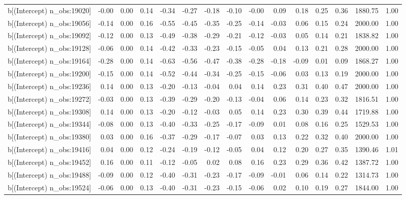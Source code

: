 \begin{table}[ht]
\begin{tabular}{rrrrrrrrrrrrrrr}
  b[(Intercept) n\_obs:19020] & -0.00 & 0.00 & 0.14 & -0.34 & -0.27 & -0.18 & -0.10 & -0.00 & 0.09 & 0.18 & 0.25 & 0.36 & 1880.75 & 1.00 \\ 
  b[(Intercept) n\_obs:19056] & -0.14 & 0.00 & 0.16 & -0.55 & -0.45 & -0.35 & -0.25 & -0.14 & -0.03 & 0.06 & 0.15 & 0.24 & 2000.00 & 1.00 \\ 
  b[(Intercept) n\_obs:19092] & -0.12 & 0.00 & 0.13 & -0.49 & -0.38 & -0.29 & -0.21 & -0.12 & -0.03 & 0.05 & 0.14 & 0.21 & 1838.82 & 1.00 \\ 
  b[(Intercept) n\_obs:19128] & -0.06 & 0.00 & 0.14 & -0.42 & -0.33 & -0.23 & -0.15 & -0.05 & 0.04 & 0.13 & 0.21 & 0.28 & 2000.00 & 1.00 \\ 
  b[(Intercept) n\_obs:19164] & -0.28 & 0.00 & 0.14 & -0.63 & -0.56 & -0.47 & -0.38 & -0.28 & -0.18 & -0.09 & 0.01 & 0.09 & 1868.27 & 1.00 \\ 
  b[(Intercept) n\_obs:19200] & -0.15 & 0.00 & 0.14 & -0.52 & -0.44 & -0.34 & -0.25 & -0.15 & -0.06 & 0.03 & 0.13 & 0.19 & 2000.00 & 1.00 \\ 
  b[(Intercept) n\_obs:19236] & 0.14 & 0.00 & 0.13 & -0.20 & -0.13 & -0.04 & 0.04 & 0.14 & 0.23 & 0.31 & 0.40 & 0.47 & 2000.00 & 1.00 \\ 
  b[(Intercept) n\_obs:19272] & -0.03 & 0.00 & 0.13 & -0.39 & -0.29 & -0.20 & -0.13 & -0.04 & 0.06 & 0.14 & 0.23 & 0.32 & 1816.51 & 1.00 \\ 
  b[(Intercept) n\_obs:19308] & 0.14 & 0.00 & 0.13 & -0.20 & -0.12 & -0.03 & 0.05 & 0.14 & 0.23 & 0.30 & 0.39 & 0.44 & 1719.88 & 1.00 \\ 
  b[(Intercept) n\_obs:19344] & -0.08 & 0.00 & 0.13 & -0.40 & -0.33 & -0.25 & -0.17 & -0.09 & 0.01 & 0.08 & 0.16 & 0.25 & 1529.53 & 1.00 \\ 
  b[(Intercept) n\_obs:19380] & 0.03 & 0.00 & 0.16 & -0.37 & -0.29 & -0.17 & -0.07 & 0.03 & 0.13 & 0.22 & 0.32 & 0.40 & 2000.00 & 1.00 \\ 
  b[(Intercept) n\_obs:19416] & 0.04 & 0.00 & 0.12 & -0.24 & -0.19 & -0.12 & -0.05 & 0.04 & 0.12 & 0.20 & 0.27 & 0.35 & 1390.46 & 1.01 \\ 
  b[(Intercept) n\_obs:19452] & 0.16 & 0.00 & 0.11 & -0.12 & -0.05 & 0.02 & 0.08 & 0.16 & 0.23 & 0.29 & 0.36 & 0.42 & 1387.72 & 1.00 \\ 
  b[(Intercept) n\_obs:19488] & -0.09 & 0.00 & 0.12 & -0.40 & -0.31 & -0.23 & -0.17 & -0.09 & -0.01 & 0.06 & 0.14 & 0.22 & 1314.73 & 1.00 \\ 
  b[(Intercept) n\_obs:19524] & -0.06 & 0.00 & 0.13 & -0.40 & -0.31 & -0.23 & -0.15 & -0.06 & 0.02 & 0.10 & 0.19 & 0.27 & 1844.00 & 1.00 \\ 

\end{tabular}
\end{table}
